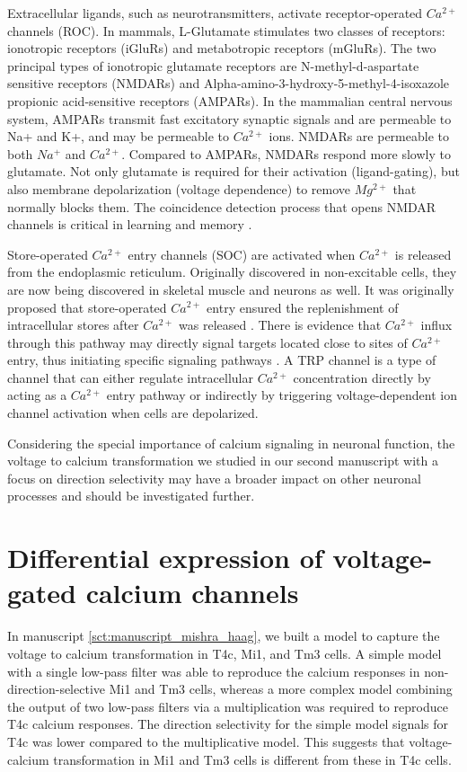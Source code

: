 Extracellular ligands, such as neurotransmitters, activate receptor-operated $Ca^{2+}$ channels (ROC). In mammals, L-Glutamate stimulates two classes of receptors: ionotropic receptors (iGluRs) and metabotropic receptors (mGluRs). The two principal types of ionotropic glutamate receptors are N-methyl-d-aspartate sensitive receptors (NMDARs) and Alpha-amino-3-hydroxy-5-methyl-4-isoxazole propionic acid-sensitive receptors (AMPARs). In the mammalian central nervous system, AMPARs transmit fast excitatory synaptic signals and are permeable to Na+ and K+, and may be permeable to $Ca^{2+}$ ions. NMDARs are permeable to both $Na^{+}$ and $Ca^{2+}$. Compared to AMPARs, NMDARs respond more slowly to glutamate. Not only glutamate is required for their activation (ligand-gating), but also membrane depolarization (voltage dependence) to remove $Mg^{2+}$ that normally blocks them. The coincidence detection process that opens NMDAR channels is critical in learning and memory \parencite{Miyashita2012}.

Store-operated $Ca^{2+}$ entry channels (SOC) are activated when $Ca^{2+}$ is released from the endoplasmic reticulum. Originally discovered in non-excitable cells, they are now being discovered in skeletal muscle and neurons as well. It was originally proposed that store-operated $Ca^{2+}$ entry ensured the replenishment of intracellular stores after $Ca^{2+}$ was released \parencite{Putney1986}. There is evidence that $Ca^{2+}$ influx through this pathway may directly signal targets located close to sites of $Ca^{2+}$ entry, thus initiating specific signaling pathways \parencite{Feske2011}. 
A TRP channel is a type of channel that can either regulate intracellular $Ca^{2+}$ concentration directly by acting as a $Ca^{2+}$ entry pathway or indirectly by triggering voltage-dependent ion channel activation when cells are depolarized.

Considering the special importance of calcium signaling in neuronal function, the voltage to calcium transformation we studied in our second manuscript with a focus on direction selectivity may have a broader impact on other neuronal processes and should be investigated further.

\section{Differential expression of voltage-gated calcium channels}

In manuscript \ref{sct:manuscript_mishra_haag}, we built a model to capture the voltage to calcium transformation in T4c, Mi1, and Tm3 cells. A simple model with a single low-pass filter was able to reproduce the calcium responses in non-direction-selective Mi1 and Tm3 cells, whereas a more complex model combining the output of two low-pass filters via a multiplication was required to reproduce T4c calcium responses. The direction selectivity for the simple model signals for T4c was lower compared to the multiplicative model. This suggests that voltage-calcium transformation in Mi1 and Tm3 cells is different from these in T4c cells. 

